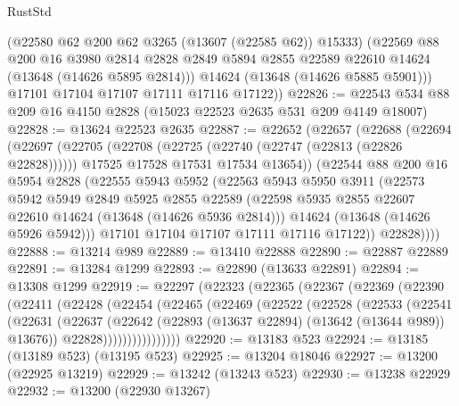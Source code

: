 \begin{lexlean}{RustStd}
\begin{coremodule}
          (@22580 @62 @200 @62 @3265 (@13607 (@22585 @62)) @15333)
          (@22569
            @88
            @200
            @16
            @3980
            @2814
            @2828
            @2849
            @5894
            @2855
            @22589
            @22610
            @14624
            (@13648 (@14626 @5895 @2814)))
          @14624
          (@13648 (@14626 @5885 @5901)))
        @17101
        @17104
        @17107
        @17111
        @17116
        @17122))
@22826 := @22543 @534 @88 @209 @16 @4150 @2828 (@15023 @22523 @2635 @531 @209 @4149 @18007)
@22828 := @13624 @22523 @2635
@22887 := @22652
    (@22657
      (@22688
        (@22694
          (@22697
            (@22705
              (@22708 (@22725 (@22740 (@22747 (@22813 (@22826 @22828))))))
              @17525
              @17528
              @17531
              @17534
              @13654))
          (@22544
            @88
            @200
            @16
            @5954
            @2828
            (@22555
              @5943
              @5952
              (@22563
                @5943
                @5950
                @3911
                (@22573
                  @5942
                  @5949
                  @2849
                  @5925
                  @2855
                  @22589
                  (@22598 @5935 @2855 @22607 @22610 @14624 (@13648 (@14626 @5936 @2814)))
                  @14624
                  (@13648 (@14626 @5926 @5942)))
                @17101
                @17104
                @17107
                @17111
                @17116
                @17122))
            @22828))))
@22888 := @13214 @989
@22889 := @13410 @22888
@22890 := @22887 @22889
@22891 := @13284 @1299
@22893 := @22890 (@13633 @22891)
@22894 := @13308 @1299
@22919 := @22297
    (@22323
      (@22365
        (@22367
          (@22369
            (@22390
              (@22411
                (@22428
                  (@22454
                    (@22465
                      (@22469
                        (@22522
                          (@22528
                            (@22533
                              (@22541
                                (@22631
                                  (@22637
                                    (@22642 (@22893 (@13637 @22894) (@13642 (@13644 @989)) @13676))
                                    @22828))))))))))))))))
@22920 := @13183 @523
@22924 := @13185 (@13189 @523) (@13195 @523)
@22925 := @13204 @18046
@22927 := @13200 (@22925 @13219)
@22929 := @13242 (@13243 @523)
@22930 := @13238 @22929
@22932 := @13200 (@22930 @13267)

\end{coremodule}
\end{lexlean}
